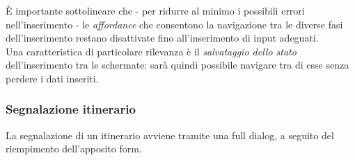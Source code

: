 \documentclass{natourDoc}
\begin{document}
È importante sottolineare che - per ridurre al minimo i possibili errori nell'inserimento - le \textit{affordance} 
che consentono la navigazione tra le diverse fasi dell'inserimento restano disattivate fino all'inserimento di input adeguati.\\

Una caratteristica di particolare rilevanza è il \textit{salvataggio dello stato} dell'inserimento tra le schermate: sarà quindi 
possibile navigare tra di esse senza perdere i dati inseriti. \\

\newpage
\subsubsection{Segnalazione itinerario}
La segnalazione di un itinerario avviene tramite una full dialog, a seguito del riempimento dell'apposito form.
\end{document}

